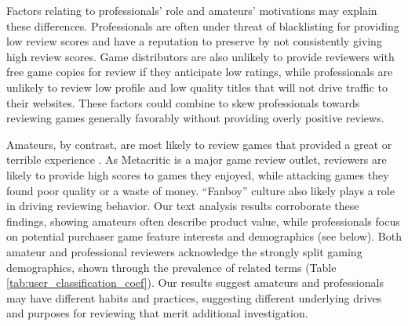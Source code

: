\documentclass[letterpaper]{article}
\begin{document}
Factors relating to professionals' role and amateurs' motivations may
explain these differences. Professionals are often under threat of
blacklisting for providing low review scores and have a reputation to
preserve by not consistently giving high review scores. Game
distributors are also unlikely to provide reviewers with free game
copies for review if they anticipate low ratings, while professionals
are unlikely to review low profile and low quality titles that will not
drive traffic to their websites. These factors could combine to skew professionals towards reviewing games generally favorably without providing overly positive reviews.

Amateurs, by contrast, are most likely to review games that provided a great or terrible experience \cite{gilbert2010deja}. As Metacritic is a major game review outlet, reviewers are likely to provide high scores to games they enjoyed, while attacking games they found poor quality or a waste of money. ``Fanboy'' culture also likely plays a role in driving reviewing behavior. Our text analysis results corroborate these findings, showing amateurs often describe product value, while professionals focus on potential purchaser game feature interests and demographics (see below). Both amateur and professional reviewers acknowledge the strongly split gaming demographics, shown through the prevalence of related terms (Table \ref{tab:user_classification_coef}). 
Our results suggest amateurs and professionals may have different habits and practices, suggesting different underlying drives and purposes for reviewing that merit additional investigation.
\end{document}
